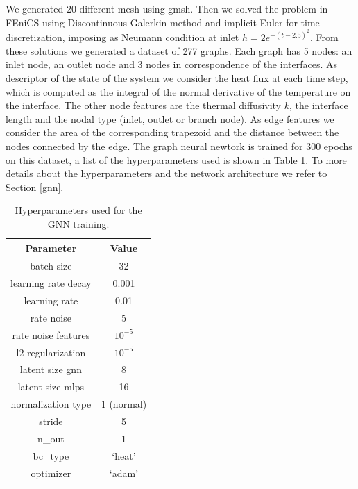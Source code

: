 \documentclass[11pt,a4paper]{article}
\begin{document}
We generated 20 different mesh using gmsh. 
Then we solved the problem in FEniCS using Discontinuous Galerkin method and implicit Euler for time discretization, imposing as Neumann condition at inlet \(h = 2e^{-(t-2.5)^2}\).
From these solutions we generated a dataset of 277 graphs. 
Each graph has 5 nodes: an inlet node, an outlet node and 3 nodes in correspondence of the interfaces. 
As descriptor of the state of the system we consider the heat flux at each time step, which is computed as the integral of the normal derivative of the temperature on the interface. The other node features are the thermal diffusivity \(k\), the interface length and the nodal type (inlet, outlet or branch node). 
As edge features we consider the area of the corresponding trapezoid and the distance between the nodes connected by the edge. 
The graph neural newtork is trained for 300 epochs on this dataset, a list of the hyperparameters used is shown in Table \ref{hyperparams}. To more details about the hyperparameters and the network architecture we refer to Section \ref{gnn}.

\begin{table}[H]
    \centering
    \begin{tabular}{|c|c|}
        \hline
        \textbf{Parameter} & \textbf{Value} \\
        \hline
        batch size & 32 \\
        learning rate decay & 0.001 \\
        learning rate & 0.01 \\
        rate noise & 5 \\
        rate noise features & \(10^{-5}\) \\
        l2 regularization & \(10^{-5}\) \\
        latent size gnn & 8 \\
        latent size mlps & 16\\
        normalization type & 1 (normal) \\
        stride & 5 \\
        n\_out & 1 \\
        bc\_type &  `heat' \\
        optimizer & `adam' \\
        \hline   
    \end{tabular}
    \caption{Hyperparameters used for the GNN training.}
    \label{hyperparams}
\end{table}

\end{document}
